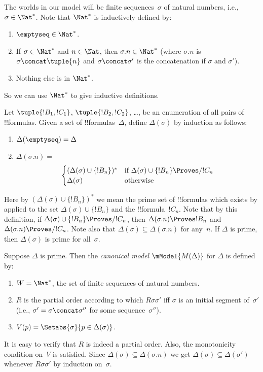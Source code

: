 \documentclass[../../../include/open-logic-section]{subfiles}
\begin{document}

The worlds in our model will be finite sequences~$\sigma$ of natural
numbers, i.e., $\sigma \in \Nat^*$. Note that $\Nat^*$ is inductively
defined by:
\begin{enumerate}
\item $\emptyseq \in \Nat^*$.
\item If $\sigma \in \Nat^*$ and $n \in \Nat$, then $\sigma.n \in
  \Nat^*$ (where $\sigma.n$ is $\sigma \concat \tuple{n}$ and $\sigma \concat \sigma'$ is the concatenation if $\sigma$ and $\sigma'$).
\item Nothing else is in $\Nat^*$.
\end{enumerate}
So we can use $\Nat^*$ to give inductive definitions.

Let $\tuple{!B_1, !C_1}$, $\tuple{!B_2, !C_2}$, \dots, be an
enumeration of all pairs of !!{formula}s. Given a set of
!!{formula}s~$\Delta$, define $\Delta(\sigma)$ by induction as
follows:
\begin{enumerate}
\item $\Delta(\emptyseq) = \Delta$
\item $\Delta(\sigma.n) = {}$
  \[
  \begin{cases}
    (\Delta(\sigma) \cup \{!B_n\})^* &
    \text{if $\Delta(\sigma) \cup \{!B_n\} \Proves/ !C_n$} \\
    \Delta(\sigma) & \text{otherwise}
  \end{cases}
  \]
\end{enumerate}
Here by $(\Delta(\sigma) \cup \{!B_n\})^*$ we mean the prime set of
!!{formula}s which exists by  applied to the
set $\Delta(\sigma) \cup \{!B_n\}$ and the !!{formula}~$!C_n$. Note that by this definition, if
$\Delta(\sigma) \cup \{!B_n\} \Proves/ !C_n$, then $\Delta(\sigma.n)
\Proves !B_n$ and $\Delta(\sigma.n) \Proves/ !C_n$.  Note also that
$\Delta(\sigma) \subseteq \Delta(\sigma.n)$ for any~$n$. If $\Delta$
is prime, then $\Delta(\sigma)$ is prime for all~$\sigma$.

\begin{defn}
  Suppose $\Delta$ is prime.  Then the \emph{canonical model} $\mModel{M(\Delta)}$ for
  $\Delta$ is defined by:
  \begin{enumerate}
  \item $W = \Nat^*$, the set of finite sequences of natural numbers.
  \item $R$ is the partial order according to which $R\sigma\sigma'$
    iff $\sigma$ is an initial segment of~$\sigma'$ (i.e., $\sigma' =
    \sigma \concat \sigma''$ for some sequence~$\sigma''$).
  \item $V(p) = \Setabs{\sigma}{p \in \Delta(\sigma)}$.
  \end{enumerate}
\end{defn}

It is easy to verify that $R$ is indeed a partial order. Also, the
monotonicity condition on~$V$ is satisfied.  Since $\Delta(\sigma)
\subseteq \Delta(\sigma.n)$ we get $\Delta(\sigma)
\subseteq \Delta(\sigma')$ whenever $R\sigma\sigma'$ by induction
on~$\sigma$.
\end{document}
